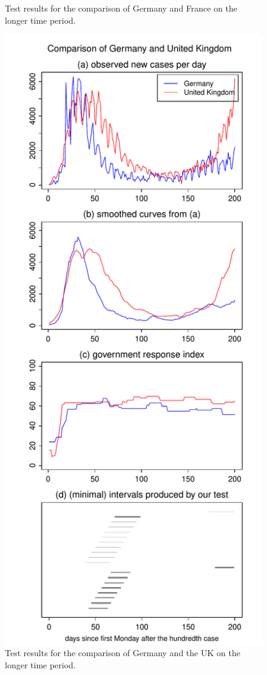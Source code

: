 \documentclass[a4paper,12pt]{article}
\numberwithin{equation}{section}
\begin{document}
{\begin{figure}[h!]
\begin{minipage}[t]{0.49\textwidth}
\caption{Test results for the comparison of Germany and France on the longer time period.}
\end{minipage}
\hspace{0.25cm}
\begin{minipage}[t]{0.49\textwidth}
\includegraphics[width=\textwidth]{plots/DEU_vs_GBR_long}
\caption{Test results for the comparison of Germany and the UK on the longer time period.}
\end{minipage}
\end{figure}



}
\end{document}
